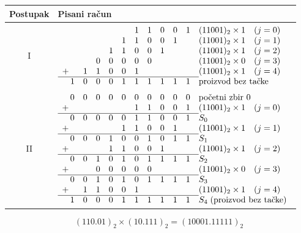 \documentclass[a4paper,11pt]{article}
\numberwithin{equation}{section}
\renewcommand{\arraystretch}{1.25}
\newcommand{\redlinija}{\arrayrulecolor{black!28}\specialrule{0.3pt}{2pt}{2pt}\arrayrulecolor{black}}
\begin{document}
\par\addvspace{\medskipamount}\noindent\begin{minipage}{\linewidth}
\centering\captionsetup{type=table}
\caption{Množenje neoznačenih brojeva: $(110.01)_{2}\times (10.111)_{2}$.}\label{tab:postupak-9}
\begingroup\small\setlength{\arraycolsep}{2pt}\renewcommand{\arraystretch}{1.02}
\begin{tabular}{@{}cl@{}}\toprule
Postupak & Pisani račun\\\midrule
I & $\begin{array}[t]{r@{\,}*{10}{c}@{\quad}l}
 &  &  &  &  &  & 1 & 1 & 0 & 0 & 1 & (11001)_2\times 1\quad(j=0) \\
 &  &  &  &  & 1 & 1 & 0 & 0 & 1 &  & (11001)_2\times 1\quad(j=1) \\
 &  &  &  & 1 & 1 & 0 & 0 & 1 &  &  & (11001)_2\times 1\quad(j=2) \\
 &  &  & 0 & 0 & 0 & 0 & 0 &  &  &  & (11001)_2\times 0\quad(j=3) \\
+ &  & 1 & 1 & 0 & 0 & 1 &  &  &  &  & (11001)_2\times 1\quad(j=4) \\
\cline{1-11}
 & 1 & 0 & 0 & 0 & 1 & 1 & 1 & 1 & 1 & 1 & \text{proizvod bez tačke} \\
\end{array}$\quad\\[5pt]
\redlinija
II & $\begin{array}[t]{r@{\,}*{10}{c}@{\quad}l}
 & 0 & 0 & 0 & 0 & 0 & 0 & 0 & 0 & 0 & 0 & \text{početni zbir }0 \\
+ &  &  &  &  &  & 1 & 1 & 0 & 0 & 1 & (11001)_2\times 1\quad(j=0) \\
\cline{1-11}
 & 0 & 0 & 0 & 0 & 0 & 1 & 1 & 0 & 0 & 1 & S_0 \\
+ &  &  &  &  & 1 & 1 & 0 & 0 & 1 &  & (11001)_2\times 1\quad(j=1) \\
\cline{1-11}
 & 0 & 0 & 0 & 1 & 0 & 0 & 1 & 0 & 1 & 1 & S_1 \\
+ &  &  &  & 1 & 1 & 0 & 0 & 1 &  &  & (11001)_2\times 1\quad(j=2) \\
\cline{1-11}
 & 0 & 0 & 1 & 0 & 1 & 0 & 1 & 1 & 1 & 1 & S_2 \\
+ &  &  & 0 & 0 & 0 & 0 & 0 &  &  &  & (11001)_2\times 0\quad(j=3) \\
\cline{1-11}
 & 0 & 0 & 1 & 0 & 1 & 0 & 1 & 1 & 1 & 1 & S_3 \\
+ &  & 1 & 1 & 0 & 0 & 1 &  &  &  &  & (11001)_2\times 1\quad(j=4) \\
\cline{1-11}
 & 1 & 0 & 0 & 0 & 1 & 1 & 1 & 1 & 1 & 1 & S_4\;\text{(proizvod bez tačke)} \\
\end{array}$\quad\\[5pt]
\bottomrule\end{tabular}\endgroup
\begin{equation}\label{eq:racun-2}
(110.01)_{2}\times (10.111)_{2}=(10001.11111)_{2}
\end{equation}
\end{minipage}
\end{document}
